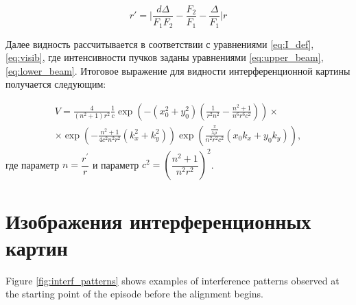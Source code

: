 \begin{equation}
    r' = \Big |\dfrac{d\Delta}{F_{1}F_{2}} - \dfrac{F_{2}}{F_{1}} - \dfrac{\Delta}{F_{1}}\Big|r
\end{equation}

Далее видность рассчитывается в соответствии с уравнениями \eqref{eq:I_def}, \eqref{eq:visib}, где интенсивности пучков заданы уравнениями \eqref{eq:upper_beam}, \eqref{eq:lower_beam}. Итоговое выражение для видности интерференционной картины получается следующим:

\begin{equation}
\begin{split}
    V =\frac{4}{\left(n^{2}+1\right) r^{2}} \frac{1}{c} \exp \left(-\left(x_{0}^{2}+y_{0}^{2}\right)\left(\frac{1}{r^{2} n^{2}}-\frac{n^{2}+1}{n^{6} r^{6} c^{2}}\right)\right) \times \\ \times \exp \left(-\frac{n^{2}+1}{4 c^{2} n^{2} r^{2}}\left(k_{x}^{2}+k_{y}^{2}\right)\right) \exp \left(\frac{\frac{\pi}{\lambda \rho^{\prime}}}{n^{2} r^{2} c^{2}}\left(x_{0} k_{x}+y_{0} k_{y}\right)\right),
\end{split}
\end{equation}
где параметр $n=\dfrac{r^{\prime}}{r}$ и параметр $c^2 = (\dfrac{n^2 + 1}{n^2r^2})^2$.

\chapter{Изображения интерференционных картин}\label{app:C}

Figure \ref{fig:interf_patterns} shows examples of interference patterns observed at the starting point of the episode before the alignment begins.


\clearpage

%
